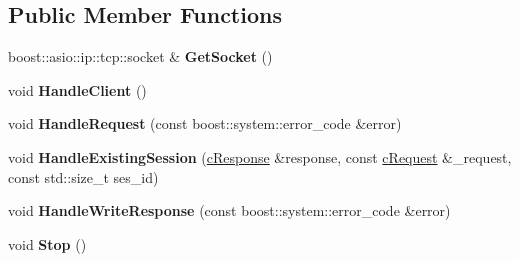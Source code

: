 \subsection*{Public Member Functions}
\begin{DoxyCompactItemize}
\item 
\hypertarget{classhttp__server_1_1cHttpConnection_ad9175494a963a2e2f7fafb31c24c4783}{boost\-::asio\-::ip\-::tcp\-::socket \& {\bfseries Get\-Socket} ()}\label{classhttp__server_1_1cHttpConnection_ad9175494a963a2e2f7fafb31c24c4783}

\item 
\hypertarget{classhttp__server_1_1cHttpConnection_a0559eb591a884a16d90f2e061a5530f6}{void {\bfseries Handle\-Client} ()}\label{classhttp__server_1_1cHttpConnection_a0559eb591a884a16d90f2e061a5530f6}

\item 
\hypertarget{classhttp__server_1_1cHttpConnection_aad4d12163015ab391b40bb15b9a5ecb0}{void {\bfseries Handle\-Request} (const boost\-::system\-::error\-\_\-code \&error)}\label{classhttp__server_1_1cHttpConnection_aad4d12163015ab391b40bb15b9a5ecb0}

\item 
\hypertarget{classhttp__server_1_1cHttpConnection_a37b521633163cac94a61206a92d62b2a}{void {\bfseries Handle\-Existing\-Session} (\hyperlink{classhttp__server_1_1cResponse}{c\-Response} \&response, const \hyperlink{classhttp__server_1_1cRequest}{c\-Request} \&\-\_\-request, const std\-::size\-\_\-t ses\-\_\-id)}\label{classhttp__server_1_1cHttpConnection_a37b521633163cac94a61206a92d62b2a}

\item 
\hypertarget{classhttp__server_1_1cHttpConnection_a128cc40027898c87335516147b767b87}{void {\bfseries Handle\-Write\-Response} (const boost\-::system\-::error\-\_\-code \&error)}\label{classhttp__server_1_1cHttpConnection_a128cc40027898c87335516147b767b87}

\item 
\hypertarget{classhttp__server_1_1cHttpConnection_aac06a1408cb3b2e20e08817858e45443}{void {\bfseries Stop} ()}\label{classhttp__server_1_1cHttpConnection_aac06a1408cb3b2e20e08817858e45443}

\end{DoxyCompactItemize}
